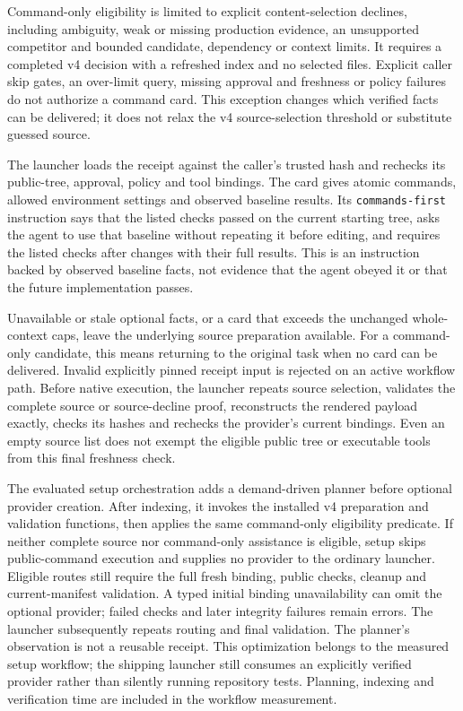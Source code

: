 \documentclass[manuscript,screen,nonacm]{acmart}
\begin{document}
Command-only eligibility is limited to explicit content-selection
declines, including ambiguity, weak or missing production evidence, an
unsupported competitor and bounded candidate, dependency or context
limits. It requires a completed v4 decision with a refreshed index and
no selected files. Explicit caller skip gates, an over-limit query,
missing approval and freshness or policy failures do not authorize a
command card. This exception changes which verified facts can be
delivered; it does not relax the v4 source-selection threshold or
substitute guessed source.

The launcher loads the receipt against the caller's trusted hash and
rechecks its public-tree, approval, policy and tool bindings. The card
gives atomic commands, allowed environment settings and observed
baseline results. Its \texttt{commands-first} instruction says that the
listed checks passed on the current starting tree, asks the agent to use
that baseline without repeating it before editing, and requires the
listed checks after changes with their full results. This is an
instruction backed by observed baseline facts, not evidence that the
agent obeyed it or that the future implementation passes.

Unavailable or stale optional facts, or a card that exceeds the
unchanged whole-context caps, leave the underlying source preparation
available. For a command-only candidate, this means returning to the
original task when no card can be delivered. Invalid explicitly pinned
receipt input is rejected on an active workflow path. Before native
execution, the launcher repeats source selection, validates the complete
source or source-decline proof, reconstructs the rendered payload
exactly, checks its hashes and rechecks the provider's current bindings.
Even an empty source list does not exempt the eligible public tree or
executable tools from this final freshness check.

The evaluated setup orchestration adds a demand-driven planner before
optional provider creation. After indexing, it invokes the installed v4
preparation and validation functions, then applies the same command-only
eligibility predicate. If neither complete source nor command-only
assistance is eligible, setup skips public-command execution and
supplies no provider to the ordinary launcher. Eligible routes still
require the full fresh binding, public checks, cleanup and
current-manifest validation. A typed initial binding unavailability can
omit the optional provider; failed checks and later integrity failures
remain errors. The launcher subsequently repeats routing and final
validation. The planner's observation is not a reusable receipt. This
optimization belongs to the measured setup workflow; the shipping
launcher still consumes an explicitly verified provider rather than
silently running repository tests. Planning, indexing and verification
time are included in the workflow measurement.
\end{document}
